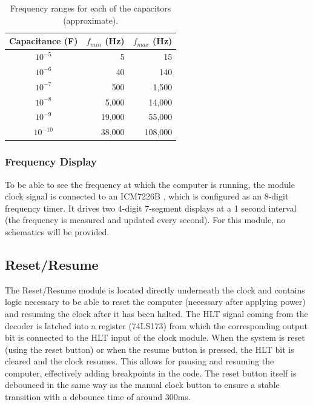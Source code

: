 \begin{table}
  \centering
  \begin{tabular}{c|r|r}
    Capacitance (F) & $f_{min}$ (Hz) & $f_{max}$ (Hz) \\ \hline
    $10^{-5}$  & 5 & 15 \\
    $10^{-6}$  & 40 & 140 \\
    $10^{-7}$  & 500 & 1,500 \\
    $10^{-8}$  & 5,000 & 14,000 \\
    $10^{-9}$  & 19,000 & 55,000 \\
    $10^{-10}$ & 38,000 & 108,000  
  \end{tabular}
  \caption{Frequency ranges for each of the capacitors (approximate).}
  \label{tab:frequencycontrol}
\end{table}

\subsubsection{Frequency Display}
To be able to see the frequency at which the computer is running, the module clock signal is connected to an ICM7226B \cite{?}, which is configured as an 8-digit frequency timer. It drives two 4-digit 7-segment displays at a 1 second interval (the frequency is measured and updated every second). For this module, no schematics will be provided.

\subsection{Reset/Resume} \label{sec:resetresume}
The Reset/Resume module is located directly underneath the clock and contains logic necessary to be able to reset the computer (necessary after applying power) and resuming the clock after it has been halted. The HLT signal coming from the decoder is latched into a register (74LS173) from which the corresponding output bit is connected to the HLT input of the clock module. When the system is reset (using the reset button) or when the resume button is pressed, the HLT bit is cleared and the clock resumes. This allows for pausing and resuming the computer, effectively adding breakpoints in the code. The reset button itself is debounced in the same way as the manual clock button to ensure a stable transition with a debounce time of around 300ms.

